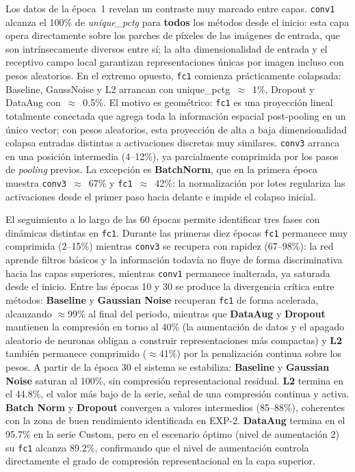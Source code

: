 Los datos de la época~1 revelan un contraste muy marcado entre capas. \texttt{conv1}
alcanza el 100\% de \textit{unique\_pctg} para \textbf{todos} los métodos desde el
inicio: esta capa opera directamente sobre los parches de píxeles de las imágenes de
entrada, que son intrínsecamente diversos entre sí; la alta dimensionalidad de entrada
y el receptivo campo local garantizan representaciones únicas por imagen incluso con
pesos aleatorios. En el extremo opuesto, \texttt{fc1} comienza prácticamente colapsada:
Baseline, GaussNoise y L2 arrancan con unique\_pctg~$\approx$~1\%, Dropout y DataAug
con~$\approx$~0.5\%. El motivo es geométrico: \texttt{fc1} es una proyección lineal
totalmente conectada que agrega toda la información espacial post-pooling en un único
vector; con pesos aleatorios, esta proyección de alta a baja dimensionalidad colapsa
entradas distintas a activaciones discretas muy similares. \texttt{conv3} arranca en
una posición intermedia (4--12\%), ya parcialmente comprimida por los pasos de
\textit{pooling} previos. La excepción es \textbf{BatchNorm}, que en la primera época
muestra \texttt{conv3}~$\approx$~67\% y \texttt{fc1}~$\approx$~42\%: la normalización
por lotes regulariza las activaciones desde el primer paso hacia delante e impide el
colapso inicial.

El seguimiento a lo largo de las 60 épocas permite identificar tres fases con dinámicas
distintas en \texttt{fc1}. Durante las primeras diez épocas \texttt{fc1} permanece muy
comprimida (2--15\%) mientras \texttt{conv3} se recupera con rapidez (67--98\%): la red
aprende filtros básicos y la información todavía no fluye de forma discriminativa hacia
las capas superiores, mientras \texttt{conv1} permanece inalterada, ya saturada desde el
inicio. Entre las épocas 10 y 30 se produce la divergencia crítica entre métodos:
\textbf{Baseline} y \textbf{Gaussian Noise} recuperan \texttt{fc1} de forma acelerada,
alcanzando $\approx$99\% al final del periodo, mientras que \textbf{DataAug} y
\textbf{Dropout} mantienen la compresión en torno al 40\% (la aumentación de datos y
el apagado aleatorio de neuronas obligan a construir representaciones más compactas) y
\textbf{L2} también permanece comprimido ($\approx$41\%) por la penalización continua
sobre los pesos. A partir de la época 30 el sistema se estabiliza: \textbf{Baseline}
y \textbf{Gaussian Noise} saturan al 100\%,
sin compresión representacional residual. \textbf{L2} termina en el 44.8\%, el valor
más bajo de la serie, señal de una compresión continua y activa. \textbf{Batch Norm}
y \textbf{Dropout} convergen a valores intermedios (85--88\%), coherentes con la zona
de buen rendimiento identificada en EXP-2. \textbf{DataAug} termina en el 95.7\% en
la serie Custom, pero en el escenario óptimo (nivel de aumentación 2) su \texttt{fc1}
alcanza 89.2\%, confirmando que el nivel de aumentación controla directamente el grado
de compresión representacional en la capa superior.

